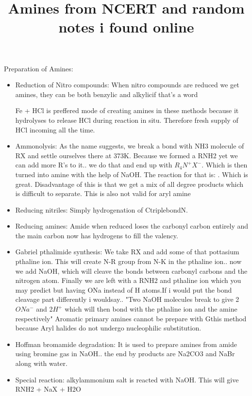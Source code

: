 \documentclass[12pt]{article}
\title{Amines from NCERT and random notes i found online}
\begin{document}
\maketitle

Preparation of Amines:
\begin{itemize}

\item Reduction of Nitro compounds: When nitro compounds are reduced
we get amines, they can be both benzylic and alkylic{if that's a word}

Fe + HCl is preffered mode of creating amines in these methods
because it hydrolyses to release HCl during reaction in situ. Therefore
fresh supply of HCl incoming all the time.

\item Ammonolysis: As the name suggests, we break a bond with NH3
molecule of RX and settle ourselves there at 373K. Because we formed
a RNH2 yet we can add more R's to it.. we do that and end up with
${R_{4}N}^{+}$$X^{-}$. Which is then turned into amine with the 
help of NaOH. The reaction for that is: .
Which is great.
Disadvantage of this is that we get a mix of all degree products
which is difficult to separate. This is also not valid for aryl amine

\item Reducing nitriles: Simply hydrogenation of CtriplebondN.

\item Reducing amines: Amide when reduced loses the carbonyl carbon
entirely and the main carbon now has hydrogens to fill the valency.

\item Gabriel pthalimide synthesis: We take RX and add some of that 
pottasium pthaline ion. This will create N-R group from N-K in the
pthaline ion.. now we add NaOH, which will cleave the bonds between
carbonyl carbons and the nitrogen atom. Finally we are left with a 
RNH2 and pthaline ion which you may predict but having ONa instead of 
H atoms.{If i would put the bond cleavage part differently i wouldsay..
"Two NaOH molecules break to give 2$ONa^{-}$ and 2$H^{+}$ which will
then bond with the pthaline ion and the amine respectively"}
Aromatic primary amines cannot be prepare with Gthis method because
Aryl halides do not undergo nucleophilic substitution.

\item Hoffman bromamide degradation: It is used to prepare amines 
from amide using bromine gas in NaOH.. the end by products are Na2CO3
 and NaBr along with water.

\item Special reaction: alkylammonium salt is reacted with NaOH.
This will give RNH2 + NaX + H2O

\end{itemize}
\end{document}
